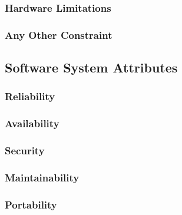 \subsubsection{Hardware Limitations}
\subsubsection{Any Other Constraint}
\subsection{Software System Attributes}
\subsubsection{Reliability}
\subsubsection{Availability}
\subsubsection{Security}
\subsubsection{Maintainability}
\subsubsection{Portability}